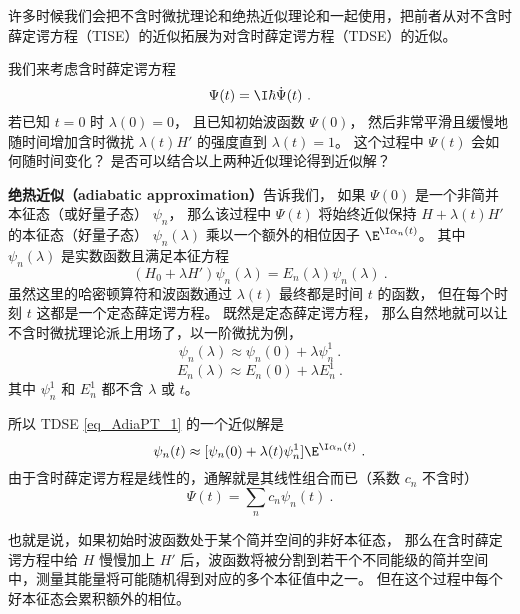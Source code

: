 

\begin{issues}
\issueDraft
\end{issues}



许多时候我们会把不含时微扰理论和绝热近似理论和一起使用，把前者从对不含时薛定谔方程（TISE）的近似拓展为对含时薛定谔方程（TDSE）的近似。

我们来考虑含时薛定谔方程
\begin{equation}
[H_0 + \lambda(t)H']\Psi(t) = \I\hbar\dot \Psi(t)~.
\end{equation}
若已知 $t=0$ 时 $\lambda(0) = 0$， 且已知初始波函数 $\Psi(0)$， 然后非常平滑且缓慢地随时间增加含时微扰 $\lambda(t) H'$ 的强度直到 $\lambda(t)=1$。 这个过程中 $\Psi(t)$ 会如何随时间变化？ 是否可以结合以上两种近似理论得到近似解？

\textbf{绝热近似（adiabatic approximation）}告诉我们， 如果 $\Psi(0)$ 是一个非简并本征态（或好量子态） $\psi_n$， 那么该过程中 $\Psi(t)$ 将始终近似保持 $H+\lambda(t) H'$ 的本征态（好量子态） $\psi_n(\lambda)$ 乘以一个额外的相位因子 $\E^{\I\alpha_n(t)}$。 其中 $\psi_n(\lambda)$ 是实数函数且满足本征方程
\begin{equation}\label{eq_AdiaPT_1}
(H_0 + \lambda H')\psi_n(\lambda) = E_n(\lambda)\psi_n(\lambda)~.
\end{equation}
虽然这里的哈密顿算符和波函数通过 $\lambda(t)$ 最终都是时间 $t$ 的函数， 但在每个时刻 $t$ 这都是一个定态薛定谔方程。 既然是定态薛定谔方程， 那么自然地就可以让不含时微扰理论派上用场了，以一阶微扰为例，
\begin{equation}
\psi_n(\lambda) \approx \psi_n(0) + \lambda\psi_n^1~.
\end{equation}
\begin{equation}
E_n(\lambda) \approx E_n(0) + \lambda E_n^1~.
\end{equation}
其中 $\psi_n^1$ 和 $E_n^1$ 都不含 $\lambda$ 或 $t$。

所以 TDSE \autoref{eq_AdiaPT_1} 的一个近似解是
\begin{equation}
\psi_n(t) \approx [\psi_n(0) + \lambda(t)\psi_n^1] \E^{\I\alpha_n(t)}~.
\end{equation}
由于含时薛定谔方程是线性的，通解就是其线性组合而已（系数 $c_n$ 不含时）
\begin{equation}
\Psi(t) = \sum_n c_n \psi_n(t)~.
\end{equation}

也就是说，如果初始时波函数处于某个简并空间的非好本征态， 那么在含时薛定谔方程中给 $H$ 慢慢加上 $H'$ 后，波函数将被分割到若干个不同能级的简并空间中，测量其能量将可能随机得到对应的多个本征值中之一。 但在这个过程中每个好本征态会累积额外的相位。
